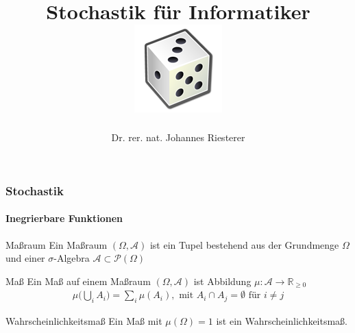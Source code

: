 \documentclass{beamer}
\begin{document}
\title[Stochastik] %
{Stochastik für Informatiker
\\
\includegraphics[scale=0.5]{img/craps}
}
\subtitle{}
\author[Dr. Johannes Riesterer] %
{Dr.  rer. nat. Johannes Riesterer}

\date[KPT 2004] %
{}

\subject{Stochastik}


\begin{frame}
    \frametitle{Stochastik}
\framesubtitle{Inegrierbare Funktionen}
    \begin{block}{Maßraum}
     Ein Maßraum $(\Omega, \mathcal{A})$ ist ein Tupel bestehend aus der Grundmenge $\Omega$ und einer $\sigma$-Algebra $\mathcal{A} \subset  \mathcal{P}(\Omega)$ 
\end{block}

\begin{block}{Maß}
    Ein Maß auf einem Maßraum $(\Omega, \mathcal{A})$ ist Abbildung
    $\mu : \mathcal{A} \to \mathbb{R}_{\geq 0}$
    \begin{align*}
    \mu \biggl(  \bigcup_i A_i  \biggr) = \sum_i \mu(A_i), \text{ mit } A_i \cap A_j = \emptyset \text{ für } i \neq j
    \end{align*}
    \end{block}
    
    \begin{block}{Wahrscheinlichkeitsmaß}
     Ein Maß mit $\mu (\Omega) = 1$ ist ein Wahrscheinlichkeitsmaß.
   \end{block}

 \end{frame}
\end{document}
